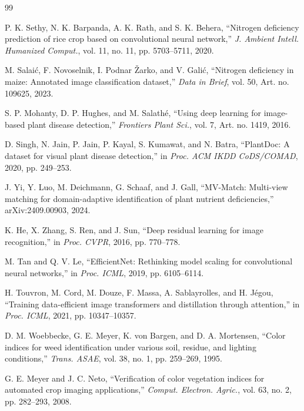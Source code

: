 \documentclass[10pt,letterpaper,twocolumn]{article}
\begin{document}
\FloatBarrier
\clearpage
\balance
\begin{thebibliography}{99}
\footnotesize

P. K. Sethy, N. K. Barpanda, A. K. Rath, and S. K. Behera, ``Nitrogen deficiency prediction of rice crop based on convolutional neural network,'' \emph{J. Ambient Intell. Humanized Comput.}, vol. 11, no. 11, pp. 5703--5711, 2020.

M. Salai\'{c}, F. Novoselnik, I. Podnar \v{Z}arko, and V. Gali\'{c}, ``Nitrogen deficiency in maize: Annotated image classification dataset,'' \emph{Data in Brief}, vol. 50, Art. no. 109625, 2023.

S. P. Mohanty, D. P. Hughes, and M. Salath\'{e}, ``Using deep learning for image-based plant disease detection,'' \emph{Frontiers Plant Sci.}, vol. 7, Art. no. 1419, 2016.

D. Singh, N. Jain, P. Jain, P. Kayal, S. Kumawat, and N. Batra, ``PlantDoc: A dataset for visual plant disease detection,'' in \emph{Proc. ACM IKDD CoDS/COMAD}, 2020, pp. 249--253.

J. Yi, Y. Luo, M. Deichmann, G. Schaaf, and J. Gall, ``MV-Match: Multi-view matching for domain-adaptive identification of plant nutrient deficiencies,'' arXiv:2409.00903, 2024.

K. He, X. Zhang, S. Ren, and J. Sun, ``Deep residual learning for image recognition,'' in \emph{Proc. CVPR}, 2016, pp. 770--778.

M. Tan and Q. V. Le, ``EfficientNet: Rethinking model scaling for convolutional neural networks,'' in \emph{Proc. ICML}, 2019, pp. 6105--6114.

H. Touvron, M. Cord, M. Douze, F. Massa, A. Sablayrolles, and H. J\'{e}gou, ``Training data-efficient image transformers and distillation through attention,'' in \emph{Proc. ICML}, 2021, pp. 10347--10357.

D. M. Woebbecke, G. E. Meyer, K. von Bargen, and D. A. Mortensen, ``Color indices for weed identification under various soil, residue, and lighting conditions,'' \emph{Trans. ASAE}, vol. 38, no. 1, pp. 259--269, 1995.

G. E. Meyer and J. C. Neto, ``Verification of color vegetation indices for automated crop imaging applications,'' \emph{Comput. Electron. Agric.}, vol. 63, no. 2, pp. 282--293, 2008.


\end{thebibliography}
\end{document}
